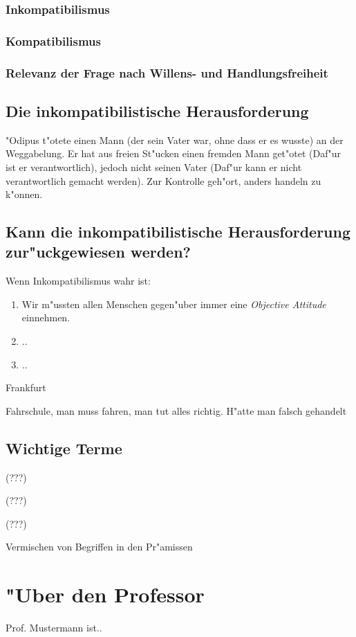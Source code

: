 \documentclass[]{scrartcl}
\begin{document}
\subsubsection{Inkompatibilismus}

\subsubsection{Kompatibilismus}

\subsubsection{Relevanz der Frage nach Willens- und Handlungsfreiheit}

\subsection{Die inkompatibilistische Herausforderung}

"Odipus t"otete einen Mann (der sein Vater war, ohne dass er es wusste) an der Weggabelung. Er hat aus freien St"ucken einen fremden Mann get"otet (Daf"ur ist er verantwortlich), jedoch nicht seinen Vater (Daf"ur kann er nicht verantwortlich gemacht werden). Zur Kontrolle geh"ort, anders handeln zu k"onnen.

\subsection{Kann die inkompatibilistische Herausforderung zur"uckgewiesen werden?}
Wenn Inkompatibilismus wahr ist: 
\begin{enumerate}
  \item Wir m"ussten allen Menschen gegen"uber immer eine \emph{Objective Attitude} einnehmen.
  \item ..
  \item ..
\end{enumerate}

Frankfurt

Fahrschule, man muss fahren, man tut alles richtig. H"atte man falsch gehandelt
\subsection{Wichtige Terme}

\begin{description}[leftmargin=!,labelwidth=\widthof{\bfseries Moralische Verantwortlichke}]
  \item[Kontrolle] {\color{red}(???)}
  \item[Moralische Verantwortlichkeit] {\color{red}(???)}
  \item[Objective Attitude] {\color{red}(???)}
  \item[Equivokation] Vermischen von Begriffen in den Pr"amissen 
\end{description}





\newpage
\section{"Uber den Professor}
Prof. Mustermann ist..


\end{document}
